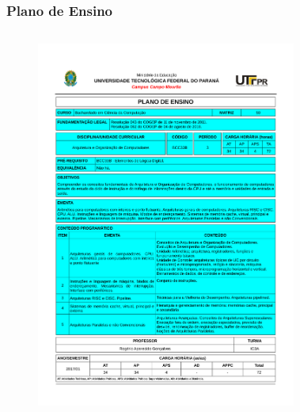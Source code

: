 \documentclass{beamer}
\begin{document}
\begin{frame}[allowframebreaks]
	\frametitle{Plano de Ensino}
	\fontsize{14pt}{7.2}\selectfont
	\begin{minipage}[t][\textheight][t]{\textwidth}
	\vspace{-0.5cm}
	\begin{columns}
			\begin{figure}
				\centering
				\includegraphics[page=1,trim=2.0cm 3.0cm 2.0cm 3.0cm, scale=0.3]{figures/plano-ensino-BCC33B-IC3A}
			\end{figure}
			\begin{figure}
				\centering

\end{figure}
\end{columns}
\end{minipage}
\end{frame}
\end{document}
